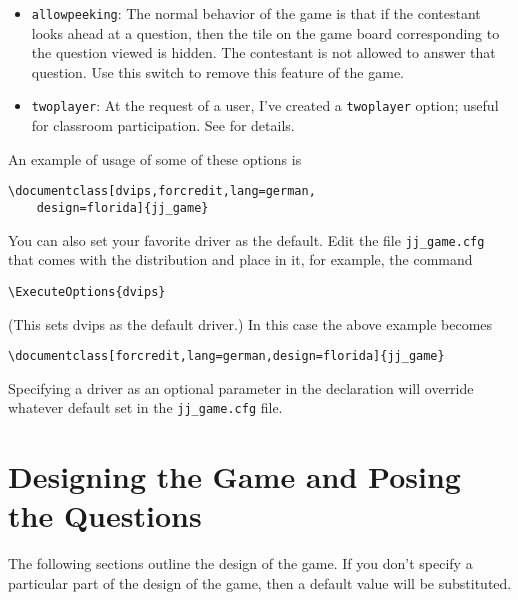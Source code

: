\documentclass{article}
\def\jj{\textsf{jj\_game}}
\begin{document}
\begin{itemize}
\item \texttt{allowpeeking}: The normal behavior of the game is that
if the contestant looks ahead at a question, then the tile on the
game board corresponding to the question viewed is hidden. The
contestant is not allowed to answer that question. Use this switch
to remove this feature of the game.

\item \texttt{twoplayer}: At the request of a user, I've created a \texttt{twoplayer} option;
useful for classroom participation. See  for details.

\end{itemize}

\newtopic\noindent
An example of usage of some of these options is
\begin{Verbatim}[xleftmargin=\amtIndent]
\documentclass[dvips,forcredit,lang=german,
    design=florida]{jj_game}
\end{Verbatim}
You can also set your favorite driver as the default.  Edit the file
\texttt{\jj.cfg} that comes with the distribution and place in it, for
example, the command
\begin{Verbatim}[xleftmargin=\amtIndent]
\ExecuteOptions{dvips}
\end{Verbatim}
\noindent(This sets \textsf{dvips} as the default driver.) In this case
the above example becomes
\begin{Verbatim}[xleftmargin=\amtIndent]
\documentclass[forcredit,lang=german,design=florida]{jj_game}
\end{Verbatim}
Specifying a driver as an optional parameter in the
 declaration will override whatever default set in
the \texttt{\jj.cfg} file.





\section{Designing the Game and Posing the Questions}

The following sections outline the design of the game.  If you
don't specify a particular part of the design of the game, then a
default value will be substituted.
\end{document}

